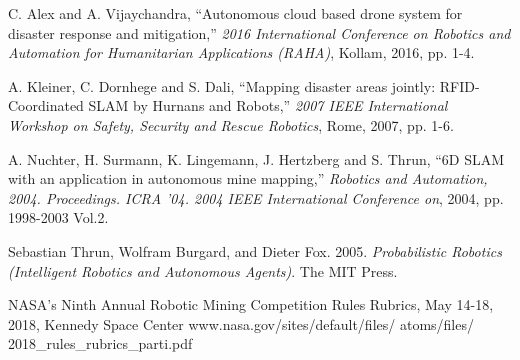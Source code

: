 \documentclass[journal]{IEEEtran}
\begin{document}
%
%
%
\begin{thebibliography}{3}

C. Alex and A. Vijaychandra, ``Autonomous cloud based drone system
for disaster response and mitigation,'' \emph{2016 International Conference 
on Robotics and Automation for Humanitarian Applications (RAHA)}, Kollam, 
2016, pp. 1-4.

A. Kleiner, C. Dornhege and S. Dali, ``Mapping disaster areas jointly: 
RFID-Coordinated SLAM by Hurnans and Robots,'' \emph{2007 IEEE International 
Workshop on Safety, Security and Rescue Robotics}, Rome, 2007, pp. 1-6.

A. Nuchter, H. Surmann, K. Lingemann, J. Hertzberg and S. Thrun, 
``6D SLAM with an application in autonomous mine mapping,'' 
\emph{Robotics and Automation, 2004. Proceedings. ICRA '04. 2004 IEEE 
International Conference on}, 2004, pp. 1998-2003 Vol.2.

Sebastian Thrun, Wolfram Burgard, and Dieter Fox. 2005. \emph{Probabilistic
Robotics (Intelligent Robotics and Autonomous Agents)}. The MIT Press.

NASA's Ninth Annual Robotic Mining Competition Rules Rubrics, May 14-18, 
2018, Kennedy Space Center www.nasa.gov/sites/default/files/ atoms/files/%
2018\_rules\_rubrics\_parti.pdf

\end{thebibliography}

% 




\end{document}
